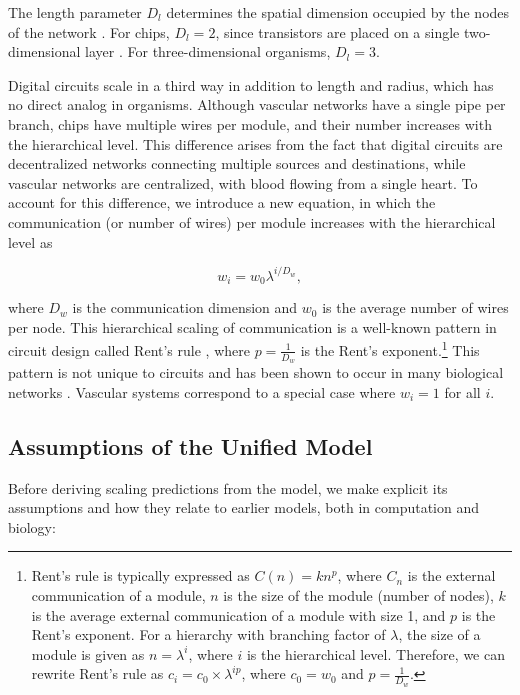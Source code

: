 \documentclass[12pt]{article}
\begin{document}
The length parameter $D_l$ determines the spatial dimension occupied by the
nodes of the network \cite{mandelbrot83}.
For chips, $D_l = 2$, since transistors are placed on a single
two-dimensional layer \cite{donath81}. For three-dimensional organisms,  $D_l = 3$.

Digital circuits scale in a third way in addition to length and radius, which
has no direct analog in organisms. Although vascular networks have a single
pipe per branch, chips have multiple wires per module, and their number
increases with the hierarchical level. This difference arises from the fact
that digital circuits are decentralized networks connecting multiple sources
and destinations, while vascular networks are centralized, with blood flowing
from a single heart. To account for this difference, we introduce a new
equation, in which the communication (or number of wires) per module increases
with the hierarchical level as

\begin{equation}
w_i = w_0 \lambda^{i/D_w},
\label{eq:communication}
\end{equation}

\noindent where $D_w$ is the communication dimension and $w_0$ is the average
number of wires per node.  This hierarchical scaling of communication is a
well-known pattern in circuit design called Rent's rule \cite{christie00},
where $p = \frac{1}{D_w}$ is the Rent's exponent.\footnote{Rent's rule is typically
  expressed as $C(n) = kn^p$, where $C_n$ is the external communication of a
  module, $n$ is the size of the module (number of nodes), $k$ is the average
  external communication of a module with size 1, and $p$ is the Rent’s
  exponent. For a hierarchy with branching factor of $\lambda$, the size of a
  module is given as $n = \lambda^i$, where $i$ is the hierarchical level.
  Therefore, we can rewrite Rent’s rule as $c_i = c_0 \times \lambda^{ip}$,
where $c_0 = w_0$ and $p = \frac{1}{D_w}$.} This pattern is not unique to circuits
and has been shown to occur in many biological networks
\cite{reda09,bassett10}.   Vascular systems correspond to a special case where 
$w_i = 1$ for all $i$. 

\subsection{Assumptions of the Unified Model}
\label{sec:assumptions}

Before deriving scaling predictions from the model, we make explicit
its  assumptions and how they relate to earlier models, both in
computation and biology:
\end{document}
